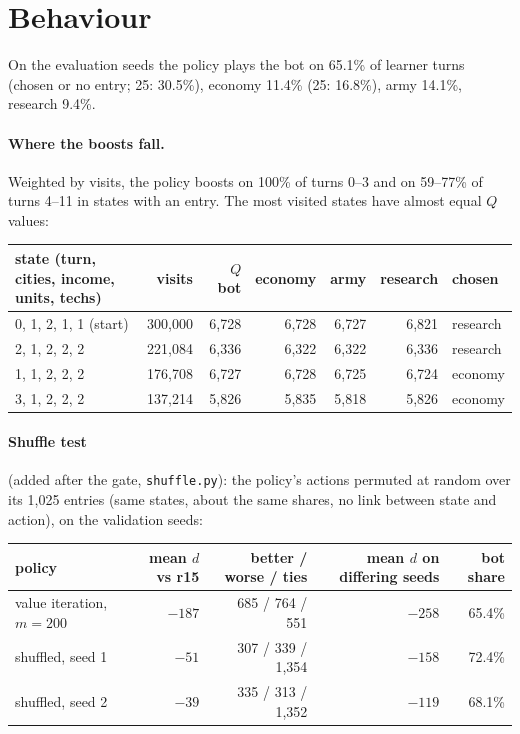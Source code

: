 \documentclass{../polyexp}
\begin{document}
\section{Behaviour}
On the evaluation seeds the policy plays the bot on 65.1\% of learner turns (chosen or no entry; 25: 30.5\%),
economy 11.4\% (25: 16.8\%), army 14.1\%, research 9.4\%.

\paragraph{Where the boosts fall.} Weighted by visits, the policy boosts on 100\% of turns 0--3 and on 59--77\% of
turns 4--11 in states with an entry. The most visited states have almost equal $Q$ values:

\begin{center}\small
\begin{tabular}{lrrrrrl}
\toprule
state (turn, cities, income, units, techs) & visits & $Q$ bot & economy & army & research & chosen \\
\midrule
0, 1, 2, 1, 1 (start) & 300{,}000 & 6{,}728 & 6{,}728 & 6{,}727 & 6{,}821 & research \\
2, 1, 2, 2, 2         & 221{,}084 & 6{,}336 & 6{,}322 & 6{,}322 & 6{,}336 & research \\
1, 1, 2, 2, 2         & 176{,}708 & 6{,}727 & 6{,}728 & 6{,}725 & 6{,}724 & economy \\
3, 1, 2, 2, 2         & 137{,}214 & 5{,}826 & 5{,}835 & 5{,}818 & 5{,}826 & economy \\
\bottomrule
\end{tabular}
\end{center}

\paragraph{Shuffle test} (added after the gate, \texttt{shuffle.py}): the policy's actions permuted at random over its
1{,}025 entries (same states, about the same shares, no link between state and action), on the validation seeds:

\begin{center}\small
\begin{tabular}{lrrrr}
\toprule
policy & mean $d$ vs r15 & better / worse / ties & mean $d$ on differing seeds & bot share \\
\midrule
value iteration, $m = 200$ & $-187$ & 685 / 764 / 551   & $-258$ & 65.4\% \\
shuffled, seed 1           & $-51$  & 307 / 339 / 1{,}354 & $-158$ & 72.4\% \\
shuffled, seed 2           & $-39$  & 335 / 313 / 1{,}352 & $-119$ & 68.1\% \\
\bottomrule
\end{tabular}
\end{center}
\end{document}

